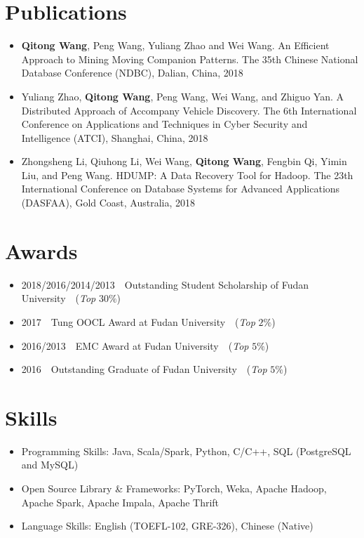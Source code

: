 \documentclass{resume}
\begin{document}
\section{Publications}
\begin{itemize}  
  \item \textbf{Qitong Wang}, Peng Wang, Yuliang Zhao and Wei Wang. 
  An Efficient Approach to Mining Moving Companion Patterns. 
  The 35th Chinese National Database Conference (NDBC), Dalian, China, 2018
  \item Yuliang Zhao, \textbf{Qitong Wang}, Peng Wang, Wei Wang, and Zhiguo Yan. 
  A Distributed Approach of Accompany Vehicle Discovery. 
  The 6th International Conference on Applications and Techniques in Cyber Security and Intelligence (ATCI), Shanghai, China, 2018
  \item Zhongsheng Li, Qiuhong Li, Wei Wang, \textbf{Qitong Wang}, Fengbin Qi, Yimin Liu, and Peng Wang. 
  HDUMP: A Data Recovery Tool for Hadoop. 
  The 23th International Conference on Database Systems for Advanced Applications (DASFAA), Gold Coast, Australia, 2018
\end{itemize}

% 
% 

\section{Awards}
\begin{itemize}
  \item 2018/2016/2014/2013\ \ Outstanding Student Scholarship of Fudan University\ \ (\textit{Top} $30\%$)
  \item 2017\ \ Tung OOCL Award at Fudan University\ \ (\textit{Top} $2\%$) %
  \item 2016/2013\ \  EMC Award at Fudan University\ \ (\textit{Top} $5\%$) %
  \item 2016\ \ Outstanding Graduate of Fudan University\ \ (\textit{Top} $5\%$) %
\end{itemize}

% 
% 

\section{Skills}
\begin{itemize}[parsep=0.5ex]
  \item Programming Skills: Java, Scala/Spark, Python, C/C++, SQL (PostgreSQL and MySQL)
  \item Open Source Library \& Frameworks: PyTorch, Weka, Apache Hadoop, Apache Spark, Apache Impala, Apache Thrift
  \item Language Skills: English (TOEFL-102, GRE-326), Chinese (Native)
\end{itemize}
\end{document}
